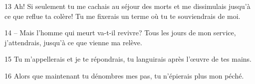 13 Ah! Si seulement tu me cachais au séjour des morts et me dissimulais jusqu’à ce que reflue ta colère! Tu me fixerais un terme où tu te souviendrais de moi.

14 – Mais l’homme qui meurt va-t-il revivre? Tous les jours de mon service, j’attendrais, jusqu’à ce que vienne ma relève.

15 Tu m’appellerais et je te répondrais, tu languirais après l’œuvre de tes mains.

16 Alors que maintenant tu dénombres mes pas, tu n’épierais plus mon péché.